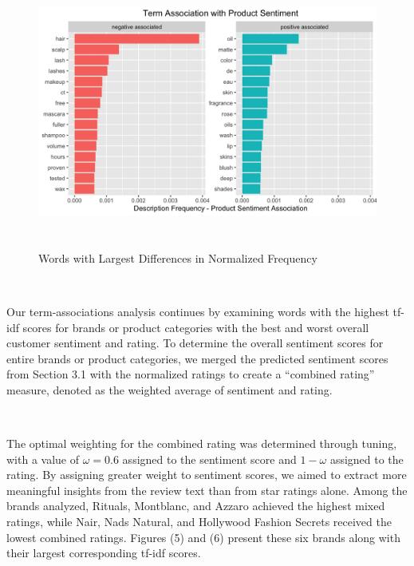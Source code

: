\documentclass[10pt]{article}
\begin{document}
\begin{figure}[ht!]
    \centering
    \hspace*{-3em}
    \includegraphics[height=90mm, width=150mm]{word_assocs_total.png}
    \caption{Words with Largest Differences in Normalized Frequency}
\end{figure}

\

Our term-associations analysis continues by examining words with the highest tf-idf scores for brands or product categories with the best and worst overall customer sentiment and rating. To determine the overall sentiment scores for entire brands or product categories, we merged the predicted sentiment scores from Section 3.1 with the normalized ratings to create a ``combined rating'' measure, denoted as the weighted average of sentiment and rating. 

\

The optimal weighting for the combined rating was determined through tuning, with a value of $\omega = 0.6$ assigned to the sentiment score and $1-\omega$ assigned to the rating. By assigning greater weight to sentiment scores, we aimed to extract more meaningful insights from the review text than from star ratings alone. Among the brands analyzed, Rituals, Montblanc, and Azzaro achieved the highest mixed ratings, while Nair, Nads Natural, and Hollywood Fashion Secrets received the lowest combined ratings. Figures (5) and (6) present these six brands along with their largest corresponding tf-idf scores. 
\end{document}
